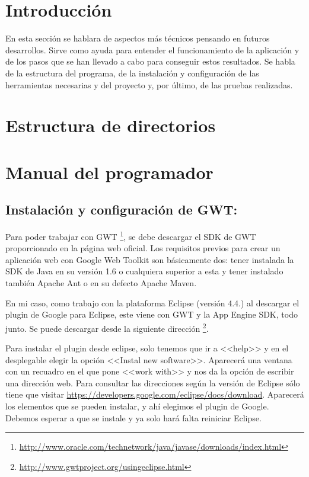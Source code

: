 
\section{Introducción}

En esta sección se hablara de aspectos más técnicos pensando en futuros desarrollos. Sirve como ayuda para entender el funcionamiento de la aplicación y de los pasos que se han llevado a cabo para conseguir estos resultados. Se habla de la estructura del programa, de la instalación y configuración de las herramientas necesarias y del proyecto y, por último, de las pruebas realizadas.

\section{Estructura de directorios}

\section{Manual del programador}


\subsection{Instalación y configuración de GWT:}


Para poder trabajar con GWT \footnote{\url{http://www.oracle.com/technetwork/java/javase/downloads/index.html}}, se debe descargar el SDK de GWT proporcionado en la página web oficial. Los requisitos previos para crear un aplicación web con Google Web Toolkit son básicamente dos: tener instalada la SDK de Java en su versión 1.6 o cualquiera superior a esta y tener instalado también Apache Ant o en su defecto Apache Maven.

En mi caso, como trabajo con la plataforma Eclipse (versión 4.4.) al descargar el plugin de Google para Eclipse, este viene con GWT y la App Engine SDK, todo junto. Se puede descargar desde la siguiente dirección \footnote{\url{http://www.gwtproject.org/usingeclipse.html}}.

Para instalar el plugin desde eclipse, solo tenemos que ir a <<help>> y en el desplegable elegir la opción <<Instal new software>>. Aparecerá una ventana con un recuadro en el que pone <<work with>> y nos da la opción de escribir una dirección web. Para consultar las direcciones según la versión de Eclipse sólo tiene que visitar \url{https://developers.google.com/eclipse/docs/download}.
Aparecerá los elementos que se pueden instalar, y ahí elegimos el plugin de Google. Debemos esperar a que se instale y ya solo hará falta reiniciar Eclipse.

